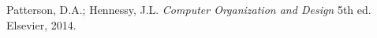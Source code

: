 \begin{thebibliography}{1}
  		Patterson, D.A.; Hennessy, J.L.
  		\emph{Computer Organization and Design}
 		 5th ed.
		Elsevier, 2014.

\end{thebibliography}
